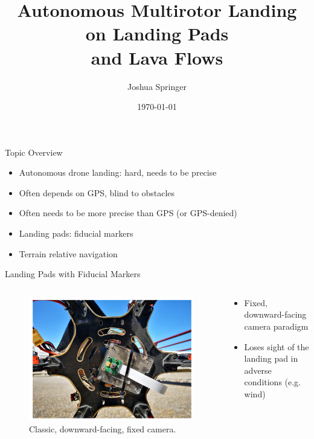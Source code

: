 \documentclass[aspectratio=169]{beamer}
\title{Autonomous Multirotor Landing on Landing Pads\\and Lava Flows}
\author{Joshua Springer}
\institute{Reykjavik University\\Department of Computer Science\\Supervisor: Marcel Kyas}
\date{\specialdate\today}
\newcommand{\nologo}{\setbeamertemplate{logo}{}}
\begin{document}
\maketitle

\nologo

\begin{frame}{Topic Overview}
	\begin{itemize}
		\item Autonomous drone landing: hard, needs to be precise
		\item Often depends on GPS, blind to obstacles
		\item Often needs to be more precise than GPS (or GPS-denied)
		\item Landing pads: fiducial markers
		\item Terrain relative navigation
	\end{itemize}
\end{frame}

\begin{frame}{Landing Pads with Fiducial Markers}
\begin{columns}
	\begin{column}{0.5\textwidth}
		\begin{figure}
		\centering
		\includegraphics[width=\textwidth]{./images/wubben_drone}
		\caption{Classic, downward-facing, fixed camera.~\cite{accurate_landing_UAV_ground_pattern}}
		\label{figure:downward_facing_fixed_camera}
		\end{figure}
	\end{column}
	\begin{column}{0.5\textwidth}
	\begin{itemize}
		\item Fixed, downward-facing camera paradigm
		\item Loses sight of the landing pad in adverse conditions (e.g. wind)
	\end{itemize}
	\end{column}
\end{columns}
\end{frame}
\end{document}
